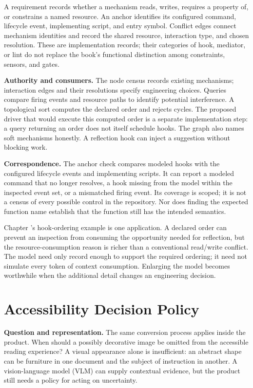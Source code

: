 A requirement records whether a mechanism reads, writes, requires a property of, or constrains a named resource. An anchor identifies its configured command, lifecycle event, implementing script, and entry symbol. Conflict edges connect mechanism identities and record the shared resource, interaction type, and chosen resolution. These are implementation records; their categories of hook, mediator, or lint do not replace the book's functional distinction among constraints, sensors, and gates.

\textbf{Authority and consumers.} The node census records existing mechanisms; interaction edges and their resolutions specify engineering choices. Queries compare firing events and resource paths to identify potential interference. A topological sort computes the declared order and rejects cycles. The proposed driver that would execute this computed order is a separate implementation step: a query returning an order does not itself schedule hooks. The graph also names soft mechanisms honestly. A reflection hook can inject a suggestion without blocking work.

\textbf{Correspondence.} The anchor check compares modeled hooks with the configured lifecycle events and implementing scripts. It can report a modeled command that no longer resolves, a hook missing from the model within the inspected event set, or a mismatched firing event. Its coverage is scoped; it is not a census of every possible control in the repository. Nor does finding the expected function name establish that the function still has the intended semantics.

Chapter 's hook-ordering example is one application. A declared order can prevent an inspection from consuming the opportunity needed for reflection, but the resource-consumption reason is richer than a conventional read/write conflict. The model need only record enough to support the required ordering; it need not simulate every token of context consumption. Enlarging the model becomes worthwhile when the additional detail changes an engineering decision.

\section{Accessibility Decision Policy}\label{heading:handbook-model-accessibility-policy}

\textbf{Question and representation.} The same conversion process applies inside the product. When should a possibly decorative image be omitted from the accessible reading experience? A visual appearance alone is insufficient: an abstract shape can be furniture in one document and the subject of instruction in another. A vision-language model (VLM) can supply contextual evidence, but the product still needs a policy for acting on uncertainty.

